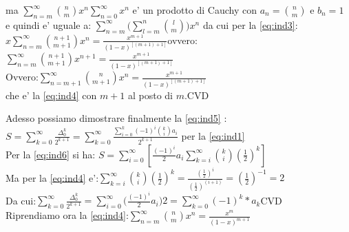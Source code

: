 \documentclass[12pt,a4paper]{article}
\begin{document}
\begin{flushleft}
\begin{itemize}
{ma  $\sum_{n=m}^{\infty}{}\binom{n}{m}x^n\sum_{n=0}^{\infty}{x^n}$  e'  un  prodotto di Cauchy con $a_n=\binom{n}{m}$ e $b_n=1$\\
\vspace{5mm}
e quindi e' uguale a: $\sum_{n=m}^{\infty}{(\sum_{l=m}^{n}{\binom{l}{m})}x^n}$  da cui per la \eqref{eq:ind3}:\\
\vspace{5mm}
$x\sum_{n=m}^{\infty}{\binom{n+1}{m+1}x^n}=\frac{x^{m+1}}{(1-x)^{[(m+1)+1]}}$\hspace{5mm}ovvero:\hspace{5mm}$\sum_{n=m}^{\infty}{\binom{n+1}{m+1}x^{n+1}}=\frac{x^{m+1}}{(1-x)^{[(m+1)+1]}}$\\
\vspace{5mm}
Ovvero:\hspace{5mm}$\sum_{n=m+1}^{\infty}{\binom{n}{m+1}x^{n}}=\frac{x^{m+1}}{(1-x)^{[(m+1)+1]}}$\\
\vspace{5mm}
che e' la \eqref{eq:ind4} con $m+1$ al posto di $m$.\hspace{20mm}CVD\\
}
\end{itemize}
\vspace{5mm}
Adesso possiamo dimostrare finalmente la \eqref{eq:ind5} :\\
\vspace{5mm}
$S=\sum_{k=0}^{\infty}\frac{\Delta_0^k}{2^{k+1}}=\sum_{k=0}^{\infty}\frac{\sum_{i=0}^{k}{(-1)^{i}\binom{k}{i}a_{i}}}{2^{k+1}}$ per la \eqref{eq:ind1}\\
\vspace{5mm}
Per la \eqref{eq:ind6} si ha:
\vspace{5mm}
$S=\sum_{i=0}^{\infty}[{\frac{(-1)^i}{2}a_{i}\sum_{k=i}^{\infty}{\binom{k}{i}(\frac{1}{2})^{k}}}]$\\
\vspace{5mm}
Ma per la \eqref{eq:ind4} e':\hspace{5mm}$\sum_{k=i}^{\infty}{\binom{k}{i}(\frac{1}{2})^{k}}=\frac{(\frac{1}{2})^i}{(\frac{1}{2})^{(i+1)}}=(\frac{1}{2})^{-1}=2$\\
\vspace{5mm}
Da cui:\hspace{22mm}$\sum_{k=0}^{\infty}\frac{\Delta_0^k}{2^{k+1}}=\sum_{i=0}^{\infty}({\frac{(-1)^i}{2}a_{i})2}=\sum_{k=0}^{\infty}{(-1)^k*a_{k}}$\hspace{20mm}CVD\\
\vspace{30mm}
Riprendiamo ora la \eqref{eq:ind4}:\hspace{20mm}$\sum_{n=m}^{\infty}{}\binom{n}{m}x^n=\frac{x^{m}}{(1-x)^{m+1}}$\\

\end{flushleft}
\end{document}
